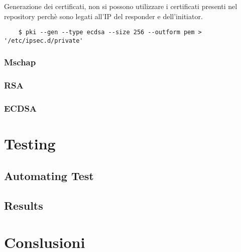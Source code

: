 \documentclass[
10pt, %
a4paper, %
oneside, %
headinclude,footinclude, %
BCOR5mm, %
]{scrartcl}
\begin{document}
Generazione dei certificati, non si possono utilizzare i certificati presenti nel repository perchè sono legati all'IP del responder e dell'initiator.
\begin{lstlisting}
    $ pki --gen --type ecdsa --size 256 --outform pem > '/etc/ipsec.d/private'
\end{lstlisting} 

\subsubsection{Mschap}

\subsubsection{RSA}

\subsubsection{ECDSA}



\section{Testing}

\subsection{Automating Test}

\subsection{Results}

\section{Conslusioni}


\renewcommand{\refname}{\spacedlowsmallcaps{References}} %




\end{document}
